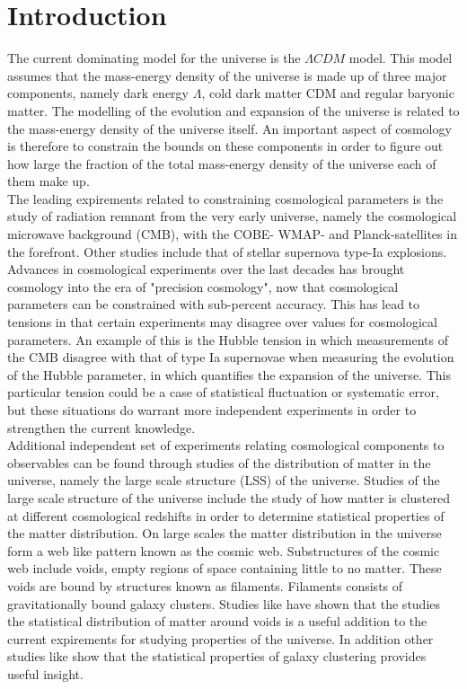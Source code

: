 \chapter{Introduction}
The current dominating model for the universe is the $\Lambda CDM$ model. This model assumes that the mass-energy density of the universe is made up of three major components, namely dark energy $\Lambda$, cold dark matter CDM and regular baryonic matter. The modelling of the evolution and expansion of the universe is related to the mass-energy density of the universe itself. An important aspect of cosmology is therefore to constrain the bounds on these components in order to figure out how large the fraction of the total mass-energy density of the universe each of them make up.\\\indent
The leading expirements related to constraining cosmological parameters is the study of radiation remnant from the very early universe, namely the cosmological microwave background (CMB)\cite{1965cmb}, with the COBE-\cite{Smoot_1999} WMAP-\cite{Wmap} and Planck-satellites\cite{planckvi} in the forefront. Other studies include that of stellar supernova type-Ia explosions\cite{Pantheon}. Advances in cosmological experiments over the last decades has brought cosmology into the era of "precision cosmology", now that cosmological parameters can be constrained with sub-percent accuracy. This has lead to tensions in that certain experiments may disagree over values for cosmological parameters. An example of this is the Hubble tension in which measurements of the CMB disagree with that of type Ia supernovae when measuring the evolution of the Hubble parameter, in which quantifies the expansion of the universe. This particular tension could be a case of statistical fluctuation or systematic error, but these situations do warrant more independent experiments in order to strengthen the current knowledge.\\\indent Additional independent set of experiments relating cosmological components to observables can be found through studies of the distribution of matter in the universe, namely the large scale structure (LSS) of the universe. Studies of the large scale structure of the universe include the study of how matter is clustered at different cosmological redshifts in order to determine statistical properties of the matter distribution. On large scales the matter distribution in the universe form a web like pattern known as the cosmic web\cite{bondweb}. Substructures of the cosmic web include voids, empty regions of space containing little to no matter. These voids are bound by structures known as filaments. Filaments consists of gravitationally bound galaxy clusters. Studies like \cite{BeyondBAO}\cite{Nadathur_2020} have shown that the studies the statistical distribution of matter around voids is a useful addition to the current expirements for studying properties of the universe. In addition other studies like \cite{refId0} show that the statistical properties of galaxy clustering provides useful insight. \\\indent
